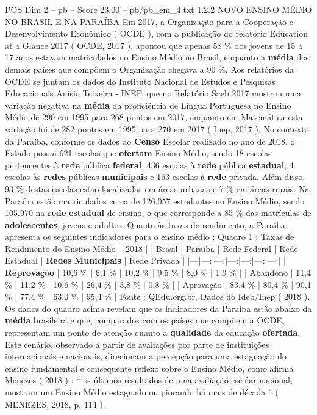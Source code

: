 \begin{textsample}{POS Dim 2 – pb – Score 23.00 – pb/pb\_em\_4.txt}  \label{ex:f2_pos_273}
1.2.2 NOVO ENSINO MÉDIO NO BRASIL E NA PARAÍBA Em 2017, a Organização para a Cooperação e Desenvolvimento Econômico ( OCDE ), com a publicação do relatório Education at a Glance 2017 ( OCDE, 2017 ), apontou que apenas 58 \% dos jovens de 15 a 17 anos estavam matriculados no Ensino Médio no Brasil, enquanto a \textbf{média} dos demais países que compõem o Organização chegava a 90 \%.
Aos relatórios da OCDE se juntam os dados do Instituto Nacional de Estudos e Pesquisas Educacionais Anísio Teixeira - INEP, que no Relatório Saeb 2017 mostrou uma variação negativa na \textbf{média} da proficiência de Língua Portuguesa no Ensino Médio de 290 em 1995 para 268 pontos em 2017, enquanto em Matemática esta variação foi de 282 pontos em 1995 para 270 em 2017 ( Inep, 2017 ).
No contexto da Paraíba, conforme os dados do \textbf{Censo} Escolar realizado no ano de 2018, o Estado possui 621 escolas que \textbf{ofertam} Ensino Médio, sendo 18 escolas pertencentes à \textbf{rede} pública \textbf{federal}, 436 escolas à \textbf{rede} pública \textbf{estadual}, 4 escolas às \textbf{redes} públicas \textbf{municipais} e 163 escolas à \textbf{rede} privada.
Além disso, 93 \% destas escolas estão localizadas em áreas urbanas e 7 \% em áreas rurais.
Na Paraíba estão matriculados cerca de 126.057 estudantes no Ensino Médio, sendo 105.970 na \textbf{rede} \textbf{estadual} de ensino, o que corresponde a 85 \% das matrículas de \textbf{adolescentes}, jovens e adultos.
Quanto às taxas de rendimento, a Paraíba apresenta os seguintes indicadores para o ensino médio : Quadro 1 : Taxas de Rendimento do Ensino Médio – 2018 | | Brasil | Paraíba | Rede Federal | Rede Estadual | \textbf{Redes} \textbf{Municipais} | Rede Privada | |---|---:|---:|---:|---:|---:|---:| | \textbf{Reprovação} | 10,6 \% | 6,1 \% | 10,2 \% | 9,5 \% | 8,0 \% | 1,9 \% | | Abandono | 11,4 \% | 11,2 \% | 10,6 \% | 26,4 \% | 3,8 \% | 0,8 \% | | Aprovação | 83,4 \% | 80,4 \% | 90,1 \% | 77,4 \% | 63,0 \% | 95,4 \% | Fonte : QEdu.org.br.
Dados do Ideb/Inep ( 2018 ).
Os dados do quadro acima revelam que os indicadores da Paraíba estão abaixo da \textbf{média} brasileira e que, comparados com os países que compõem a OCDE, representam um ponto de atenção quanto à \textbf{qualidade} da educação \textbf{ofertada}.
Este cenário, observado a partir de avaliações por parte de instituições internacionais e nacionais, direcionam a percepção para uma estagnação do ensino fundamental e consequente reflexo sobre o Ensino Médio, como afirma Menezes ( 2018 ) : “ os últimos resultados de uma avaliação escolar nacional, mostram um Ensino Médio estagnado ou piorando há mais de década ” ( MENEZES, 2018, p. 114 ).

\end{textsample}
